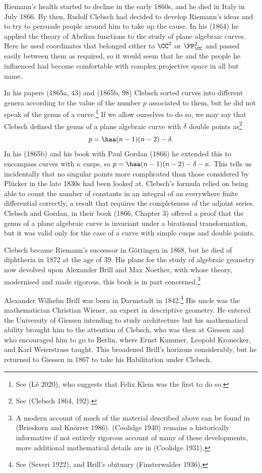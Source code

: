 Riemann's health started to decline in the early 1860s, and he  died in Italy in July 1866. By then, Rudolf Clebsch had decided to develop Riemann's ideas and to try to persuade people around him to take up the cause. In his (1864) he  applied the theory of Abelian functions to the study of plane algebraic curves. Here he used coordinates that belonged  either to $\CC^2$ or $\PP_{\CC}^2$ and  passed easily between them as required, so it would seem that he and the people he influenced had become comfortable with complex projective space in all but name.

In his papers (1865a, 43) and (1865b, 98) Clebsch sorted curves into different genera according to the value of the number $p$ associated to them, but he did not speak of the genus of a curve.\footnote{See (L\^e 2020), who suggests that Felix Klein was the first to do so.} If we allow ourselves to do so, we may say that Clebsch defined the genus of a plane algebraic curve with $\delta$ double points as\footnote{See (Clebsch 1864, 192).} 
$$p = \haa (n-1)(n-2) - \delta.$$
In his (1865b) and his book with Paul Gordan (1866) he extended this to encompass curves with 
$\kappa$ cusps, so $p= \haa (n-1)(n-2) - \delta - \kappa.$ This tells us incidentally that no singular points more complicated than those considered by Pl\"ucker in the late 1830s had been looked at. Clebsch's formula relied on being able to count the number of constants in an integral of an everywhere finite differential correctly, a result that requires the  completeness of the adjoint series. Clebsch and Gordan, in their book (1866, Chapter 3) offered a proof that the genus of a plane algebraic curve is invariant under a birational transformation, but it was valid only for the case of a curve with simple cusps and double points. 


Clebsch became   Riemann's successor in G\"ottingen in 1868, but  he died of diphtheria in 1872 at the age of 39. His plans for the study of algebraic geometry now devolved upon Alexander Brill and Max Noether, with whose theory, modernised and made rigorous,  this book is in part concerned.\footnote{A modern account of  much of the material described above can be found in (Brieskorn and Kn\"orrer 1986). (Coolidge 1940) remains a historically informative if not entirely rigorous account of many of these developments, more additional mathematical details are in (Coolidge 1931).}

Alexander Wilhelm Brill was born in Darmstadt in 1842.\footnote{See (Severi 1922),  and Brill's obituary (Finsterwalder 1936).} His  uncle was the mathematician Christian Wiener, an expert in descriptive geometry. He entered the University of Giessen intending to study architecture but his mathematical ability brought him to the attention of Clebsch, who was then at Giessen and who encouraged him to go  to Berlin, where  Ernst Kummer,  Leopold Kronecker, and Karl Weierstrass taught. This broadened Brill's horizons considerably, but he returned to Giessen in 1867 to take his Habilitation  under Clebsch.


